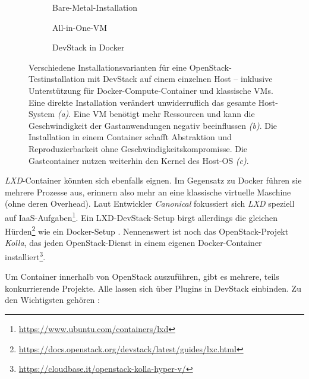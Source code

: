 \begin{figure}[ht]
	\centering
	\begin{subfigure}[b]{0.29\textwidth}
		\def\svgwidth{\linewidth}
		{\tiny \textsf{
			}}
		\caption{Bare-Metal-Installation}
		\label{fig:sub:devstack-bare-metal}
	\end{subfigure}\hfill%
	\begin{subfigure}[b]{0.31\textwidth}
		\def\svgwidth{\linewidth}
		{\tiny \textsf{
			}}
		\caption{All-in-One-VM}
		\label{fig:sub:devstack-vm}
	\end{subfigure}\hfill%
	\begin{subfigure}[b]{0.31\textwidth}
		\def\svgwidth{\linewidth}
		{\tiny \textsf{
			}}
		\caption{DevStack in Docker}
		\label{fig:sub:devstack-docker}
	\end{subfigure}
	
	\caption{Verschiedene Installationsvarianten für eine OpenStack-Testinstallation mit DevStack auf einem einzelnen Host -- inklusive Unterstützung für Docker-Compute-Container und klassische VMs. Eine direkte Installation verändert unwiderruflich das gesamte Host-System \emph{(a)}. Eine VM benötigt mehr Ressourcen und kann die Geschwindigkeit der Gastanwendungen negativ beeinflussen \emph{(b)}. Die Installation in einem Container schafft Abstraktion und Reproduzierbarkeit ohne Geschwindigkeitskompromisse. Die Gastcontainer nutzen weiterhin den Kernel des Host-OS \emph{(c)}.}
	\label{fig:devstack}
\end{figure}

\emph{LXD}-Container könnten sich ebenfalls eignen. Im Gegensatz zu Docker führen sie mehrere Prozesse aus, erinnern also mehr an eine klassische virtuelle Maschine (ohne deren Overhead). Laut Entwickler \emph{Canonical} fokussiert sich \emph{LXD} speziell auf IaaS-Aufgaben\footnote{\url{https://www.ubuntu.com/containers/lxd}}. Ein LXD-DevStack-Setup birgt allerdings die gleichen Hürden\footnote{\url{https://docs.openstack.org/devstack/latest/guides/lxc.html}} wie ein Docker-Setup \cite{graber:2016:openstack-lxd}. Nennenswert ist noch das OpenStack-Projekt \emph{Kolla}, das jeden OpenStack-Dienst in einem eigenen Docker-Container installiert\footnote{\url{https://cloudbase.it/openstack-kolla-hyper-v/}}.

Um Container innerhalb von OpenStack auszuführen, gibt es mehrere, teils konkurrierende Projekte. Alle lassen sich über Plugins in DevStack einbinden. Zu den Wichtigsten gehören \cite{singh:2017:containers-openstack}:

